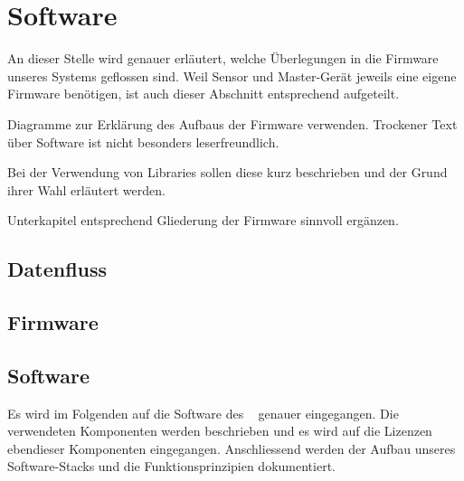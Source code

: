 \chapter{Software}
\label{chap:software}


An  dieser  Stelle wird  genauer  erl\"autert,  welche \"Uberlegungen  in  die
Firmware  unseres  Systems  geflossen  sind. Weil  Sensor  und  Master-Ger\"at
jeweils  eine   eigene  Firmware   ben\"otigen,  ist  auch   dieser  Abschnitt
entsprechend aufgeteilt.

\anweisung   Diagramme    zur   Erkl\"arung    des   Aufbaus    der   Firmware
verwenden. Trockener    Text    \"uber    Software   ist    nicht    besonders
leserfreundlich.

\anweisung Bei der Verwendung von  Libraries sollen diese kurz beschrieben und
der Grund ihrer Wahl erl\"autert werden.

\anweisung   Unterkapitel  entsprechend   Gliederung  der   Firmware  sinnvoll
erg\"anzen.


\section{Datenfluss}
\label{sec:fw:dataFlow}


\section{Firmware \Sensor}
\label{sec:firmware:sensor}


\section{Software \Master}
\label{sec:software:master}

Es wird  im Folgenden auf  die Software des \Master~  genauer eingegangen. Die
verwendeten  Komponenten  werden beschrieben  und  es  wird auf  die  Lizenzen
ebendieser  Komponenten eingegangen. Anschliessend  werden der  Aufbau unseres
Software-Stacks und die Funktionsprinzipien dokumentiert.


